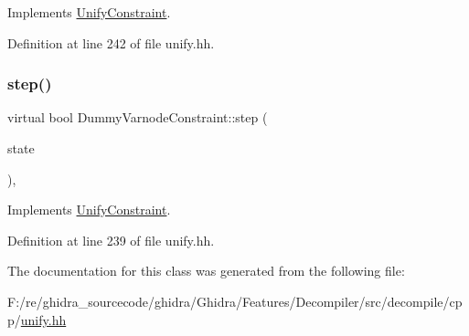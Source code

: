 Implements \mbox{\hyperlink{class_unify_constraint_a774f6a611a96384766cb8e8d8f5ff41f}{Unify\+Constraint}}.



Definition at line 242 of file unify.\+hh.

\mbox{\label{class_dummy_varnode_constraint_a70d9094ae099aa7f9259e2374ca1a8ed}} 
\subsubsection{\texorpdfstring{step()}{step()}}
{\footnotesize\ttfamily virtual bool Dummy\+Varnode\+Constraint\+::step (\begin{DoxyParamCaption}\item[{\mbox{\hyperlink{class_unify_state}{Unify\+State}} \&}]{state }\end{DoxyParamCaption})\hspace{0.3cm}{\ttfamily [inline]}, {\ttfamily [virtual]}}



Implements \mbox{\hyperlink{class_unify_constraint_ad9ab4ad91037f96bf803735d414d212d}{Unify\+Constraint}}.



Definition at line 239 of file unify.\+hh.



The documentation for this class was generated from the following file\+:\begin{DoxyCompactItemize}
\item 
F\+:/re/ghidra\+\_\+sourcecode/ghidra/\+Ghidra/\+Features/\+Decompiler/src/decompile/cpp/\mbox{\hyperlink{unify_8hh}{unify.\+hh}}\end{DoxyCompactItemize}
